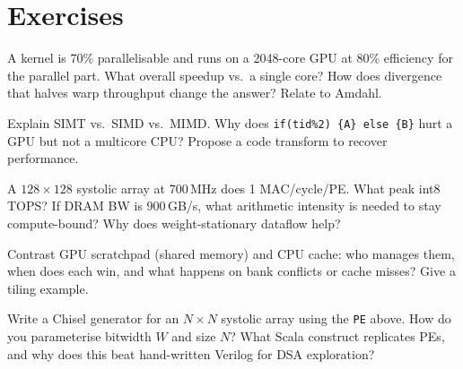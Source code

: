 \section{Exercises}
\begin{exercise}A kernel is 70\% parallelisable and runs on a 2048-core GPU at 80\% efficiency for the parallel part. What overall speedup vs.\ a single core? How does divergence that halves warp throughput change the answer? Relate to Amdahl.\end{exercise}
\begin{exercise}Explain SIMT vs.\ SIMD vs.\ MIMD. Why does \texttt{if(tid\%2) \{A\} else \{B\}} hurt a GPU but not a multicore CPU? Propose a code transform to recover performance.\end{exercise}
\begin{exercise}A $128\times128$ systolic array at 700\,MHz does 1 MAC/cycle/PE. What peak int8 TOPS? If DRAM BW is 900\,GB/s, what arithmetic intensity is needed to stay compute-bound? Why does weight-stationary dataflow help?\end{exercise}
\begin{exercise}Contrast GPU scratchpad (shared memory) and CPU cache: who manages them, when does each win, and what happens on bank conflicts or cache misses? Give a tiling example.\end{exercise}
\begin{exercise}Write a Chisel generator for an $N\times N$ systolic array using the \texttt{PE} above. How do you parameterise bitwidth $W$ and size $N$? What Scala construct replicates PEs, and why does this beat hand-written Verilog for DSA exploration?\end{exercise}
